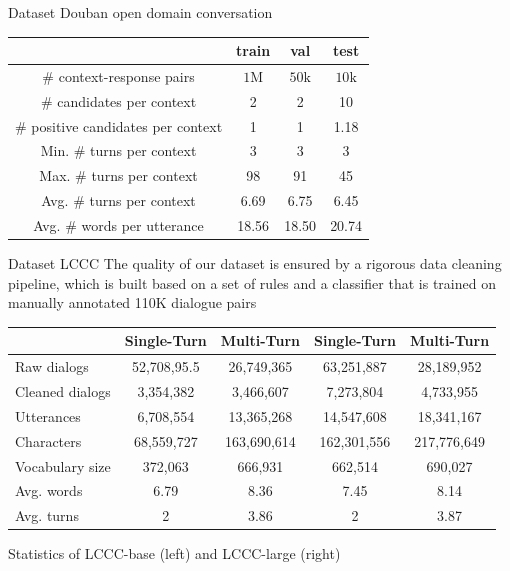 \documentclass{beamer}
\begin{document}
\begin{frame}{Dataset Douban}
 open domain conversation

 \begin{tabular}{c|c|c|c}
\hline & train & val & test \\
\hline # context-response pairs & $1 \mathrm{M}$ & $50 \mathrm{k}$ & $10 \mathrm{k}$ \\
\hline # candidates per context & 2 & 2 & 10 \\
\hline # positive candidates per context & 1 & 1 & 1.18 \\
\hline Min. # turns per context & 3 & 3 & 3 \\
\hline Max. # turns per context & 98 & 91 & 45 \\
\hline Avg. # turns per context & 6.69 & 6.75 & 6.45 \\
\hline Avg. # words per utterance & 18.56 & 18.50 & 20.74 \\
\hline
\end{tabular}

\end{frame}

\begin{frame}{Dataset LCCC}
 The quality of our dataset is ensured by a rigorous data cleaning pipeline, which
is built based on a set of rules and a classifier that is trained on manually annotated 110K dialogue pairs
    \begin{center}\footnotesize
        \begin{tabular}{l|c|c|c|c}
\hline & Single-Turn & Multi-Turn & Single-Turn& Multi-Turn \\
\hline Raw dialogs & 52,708,95.5 & 26,749,365 & 63,251,887 & 28,189,952 \\
Cleaned dialogs & 3,354,382 & 3,466,607 & 7,273,804 & 4,733,955 \\
Utterances & 6,708,554 & 13,365,268 & 14,547,608 & 18,341,167 \\
Characters & 68,559,727 & 163,690,614 & 162,301,556 & 217,776,649 \\
Vocabulary size & 372,063 & 666,931 & 662,514 & 690,027 \\
Avg. words & 6.79 & 8.36 & 7.45 & 8.14 \\
Avg. turns & 2 & 3.86 & 2 & 3.87 \\
\hline
\end{tabular}
Statistics of LCCC-base (left) and LCCC-large (right)
    \end{center}

\end{frame}
\end{document}
